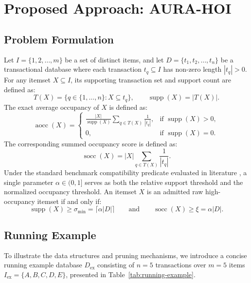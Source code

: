 \documentclass[runningheads,orivec]{llncs}
\newcommand{\supp}{\operatorname{supp}}
\newcommand{\aocc}{\operatorname{aocc}}
\newcommand{\socc}{\operatorname{socc}}
\begin{document}
\section{Proposed Approach: AURA-HOI}

\subsection{Problem Formulation}

Let $I = \{1, 2, \dots, m\}$ be a set of distinct items, and let $D = \{t_1, t_2, \dots, t_n\}$ be a transactional database where each transaction $t_q \subseteq I$ has non-zero length $|t_q| > 0$. For any itemset $X \subseteq I$, its supporting transaction set and support count are defined as:
\begin{equation}
T(X) = \{q \in \{1, \dots, n\} : X \subseteq t_q\}, \qquad \supp(X) = |T(X)|.
\end{equation}
The exact average occupancy of $X$ is defined as:
\begin{equation}
\aocc(X) = \begin{cases}
\displaystyle \frac{|X|}{\supp(X)} \sum_{q \in T(X)} \frac{1}{|t_q|}, & \text{if } \supp(X) > 0, \\[1.2ex]
0, & \text{if } \supp(X) = 0.
\end{cases}
\end{equation}
The corresponding summed occupancy score is defined as:
\begin{equation}
\socc(X) = |X| \sum_{q \in T(X)} \frac{1}{|t_q|}.
\end{equation}
Under the standard benchmark compatibility predicate evaluated in literature \cite{deng2020mining,nguyen2023efficient}, a single parameter $\alpha \in (0, 1]$ serves as both the relative support threshold and the normalized occupancy threshold. An itemset $X$ is an admitted raw high-occupancy itemset if and only if:
\begin{equation}
\supp(X) \ge \sigma_{\min} = \lceil \alpha |D| \rceil \qquad \text{and} \qquad \socc(X) \ge \xi = \alpha |D|.
\label{eq:predicate}
\end{equation}

\subsection{Running Example}
To illustrate the data structures and pruning mechanisms, we introduce a concise running example database $D_{\mathrm{ex}}$ consisting of $n=5$ transactions over $m=5$ items $I_{\mathrm{ex}} = \{A, B, C, D, E\}$, presented in Table~\ref{tab:running-example}.
\end{document}
